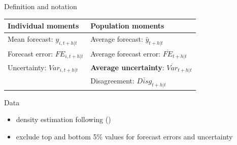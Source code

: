 \documentclass{beamer}
\begin{document}
\begin{frame}{Definition and notation}
	\begin{table}[ht]
		\centering
		\label{MomSum}
		\begin{tabular}{ll}
			
			\hline 
			Individual moments                                  & Population moments                             \\
			\hline 
			Mean forecast: $y_{i,t+h|t}$                   & Average forecast: $\bar y_{t+h|t}$                   \\
			Forecast error: $FE_{i,t+h|t}$ & Average forecast error: $\overline{FE}_{t+h|t}$ \\
			Uncertainty: $Var_{i,t+h|t}$         & \textbf{Average uncertainty}:  $\overline{Var}_{t+h|t}$ \\
			& Disagreement:  $\overline{Disg}_{t+h|t}$       \\
			\hline 
		\end{tabular}
	\end{table}
	
\end{frame}


\begin{frame}{Data}
	\begin{table}[]
	\end{table}
\begin{itemize}
	\item density estimation following (\citet{engelberg2009comparing})
	\item exclude top and bottom 5\% values for forecast errors and uncertainty
\end{itemize}
\end{frame}
\end{document}
